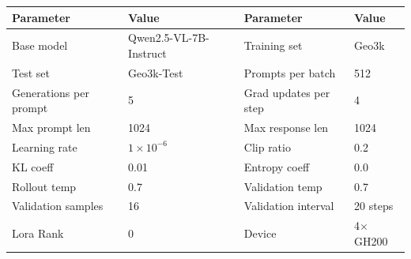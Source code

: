 \documentclass{article}
\theoremstyle{plain}
\theoremstyle{definition}
\theoremstyle{remark}
\begin{document}
\begin{table}[h]
  \centering
  \label{tab:config-7b-vl}
  \begin{tcolorbox}[
    enhanced, hbox,
    title={Training setup of Qwen2.5-VL-7B-Instruct},
    colback=teal!5, colframe=teal, coltext=black, coltitle=white,
    fonttitle=\bfseries, arc=1mm, boxrule=1pt, boxsep=1pt,
    left=2pt, right=2pt, top=0pt, bottom=2pt,
    toptitle=3pt, bottomtitle=3pt, center
  ]
    \small
    \renewcommand{\arraystretch}{1.2}
    \setlength{\tabcolsep}{8pt}
    \begin{tabular}{l|l|l|l}
      \textbf{Parameter} & \textbf{Value} & \textbf{Parameter} & \textbf{Value} \\
      \hline
      Base model & Qwen2.5-VL-7B-Instruct & Training set & Geo3k \\
      Test set & Geo3k-Test & Prompts per batch & 512 \\
      Generations per prompt & 5 & Grad updates per step & 4 \\
      Max prompt len & 1024 & Max response len & 1024 \\
      Learning rate & $1 \times 10^{-6}$ & Clip ratio & 0.2 \\
      KL coeff & 0.01 & Entropy coeff & 0.0 \\
      Rollout temp & 0.7 & Validation temp & 0.7 \\
      Validation samples & 16 & Validation interval & 20 steps \\
      Lora Rank & 0 & Device & 4$\times$GH200 \\
    \end{tabular}
  \end{tcolorbox}
\end{table}
\end{document}
